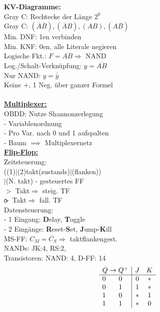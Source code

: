 \documentclass[8pt]{extarticle}
\begin{document}
\begin{minipage}{0.33\textwidth}
\textbf{KV-Diagramme:}\\
Gray C: Rechtecke der Länge $2^k$\\
Gray C: $(\overline{A} \overline{B}), (\overline{A}B), (AB), (A\overline{B})$\\
Min. DNF: 1en verbinden\\
Min. KNF: 0en, alle Literale negieren\\
Logische Fkt.: $F = \overline{AB} \Rightarrow $ NAND \\
Log./Schalt-Verknüpfung: $y = \overline{AB} $\\
Nur NAND: $y = \overline{\overline{y}}$ \\
\phantom{sssi} Keine +, 1 Neg. über ganzer Formel\\
%
\vspace{5cm} \\
%
\underline{\textbf{Multiplexer:}}\\
OBDD: Nutze Shannonzerlegung\\
- Variablenordnung \\
- Pro Var. nach 0 und 1 aufspalten \\
- Baum $\implies$ Multiplexernetz \\

\underline{\textbf{Flip-Flop:}}\\
Zeitsteuerung:\\ ((1)$|$(2)takt(zustands)$|$(flanken))\\$|$(N. takt) - gesteuertes FF\\
$>$ Takt$\Rightarrow$ steig. TF\\
$\rlap{o}{>}$ Takt$\Rightarrow$ fall. TF\\
Datensteuerung:\\
- 1 Eingang: \textbf{D}elay, \textbf{T}oggle \\
- 2 Eingänge: \textbf{R}eset-\textbf{S}et, \textbf{J}ump-\textbf{K}ill \\
MS-FF: $C_M= \overline{C_S} \Rightarrow $ taktflankengest.\\
NANDs: JK:4, RS:2,\\
Transistoren: NAND: 4, D-FF: 14 \\
\[
\begin{array}{cc|cc}
    \multicolumn{2}{c|}{Q \to Q^+} & J & K \\
    \hline
    0 & 0 & 0 & * \\
    0 & 1 & 1 & * \\
    1 & 0 & * & 1 \\
    1 & 1 & * & 0
\end{array}
\] \\

\end{minipage}
\end{document}
